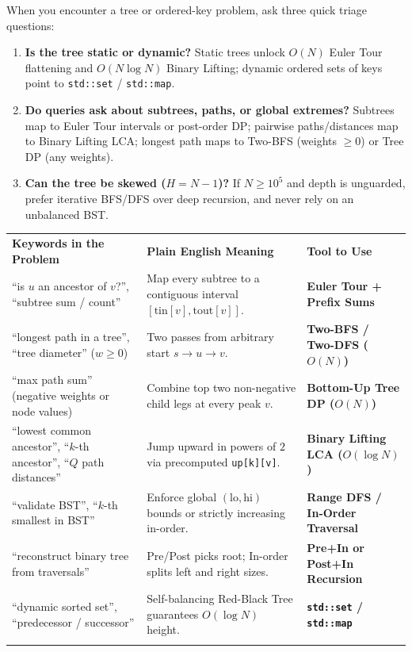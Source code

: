 \documentclass[11pt,a4paper]{article}
\theoremstyle{definition}
\begin{document}
When you encounter a tree or ordered-key problem, ask three quick triage questions:
\begin{enumerate}
    \item \textbf{Is the tree static or dynamic?} Static trees unlock $O(N)$ Euler Tour flattening and $O(N \log N)$ Binary Lifting; dynamic ordered sets of keys point to \texttt{std::set} / \texttt{std::map}.
    \item \textbf{Do queries ask about subtrees, paths, or global extremes?} Subtrees map to Euler Tour intervals or post-order DP; pairwise paths/distances map to Binary Lifting LCA; longest path maps to Two-BFS (weights $\ge 0$) or Tree DP (any weights).
    \item \textbf{Can the tree be skewed ($H = N - 1$)?} If $N \ge 10^5$ and depth is unguarded, prefer iterative BFS/DFS over deep recursion, and never rely on an unbalanced BST.
\end{enumerate}

\begingroup\small{}
\begin{tabularx}{\textwidth}{>{\raggedright\arraybackslash}p{4.3cm} >{\raggedright\arraybackslash}X >{\raggedright\arraybackslash\bfseries}p{4.0cm}}
\arrayrulecolor{primaryblue}\toprule[1.2pt]
\rowcolor{primaryblue!10}
\textcolor{primaryblue}{\textbf{Keywords in the Problem}} & \textcolor{primaryblue}{\textbf{Plain English Meaning}} & \textcolor{primaryblue}{\textbf{Tool to Use}} \\
\arrayrulecolor{codeframe}\midrule[0.6pt]
``is $u$ an ancestor of $v$?'', ``subtree sum / count'' & Map every subtree to a contiguous interval $[\text{tin}[v], \text{tout}[v]]$. & Euler Tour + Prefix Sums \\
``longest path in a tree'', ``tree diameter'' ($w \ge 0$) & Two passes from arbitrary start $s \to u \to v$. & Two-BFS / Two-DFS ($O(N)$) \\
``max path sum'' (negative weights or node values) & Combine top two non-negative child legs at every peak $v$. & Bottom-Up Tree DP ($O(N)$) \\
``lowest common ancestor'', ``$k$-th ancestor'', ``$Q$ path distances'' & Jump upward in powers of $2$ via precomputed \texttt{up[k][v]}. & Binary Lifting LCA ($O(\log N)$) \\
``validate BST'', ``$k$-th smallest in BST'' & Enforce global $(\text{lo}, \text{hi})$ bounds or strictly increasing in-order. & Range DFS / In-Order Traversal \\
``reconstruct binary tree from traversals'' & Pre/Post picks root; In-order splits left and right sizes. & Pre+In or Post+In Recursion \\
``dynamic sorted set'', ``predecessor / successor'' & Self-balancing Red-Black Tree guarantees $O(\log N)$ height. & \texttt{std::set} / \texttt{std::map} \\
\arrayrulecolor{primaryblue}\bottomrule[1.2pt]
\end{tabularx}\endgroup
\end{document}
